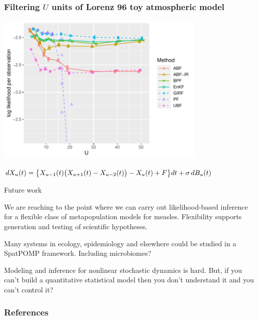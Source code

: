\documentclass{beamer}
\begin{document}
\begin{frame}
\frametitle{Filtering $U$ units of Lorenz 96 toy atmospheric model} 

\vspace{-3mm}

\begin{center}
\includegraphics[width=10cm]{lz_loglik_plot-1.pdf}

\vspace{-1mm}

$dX_{u}(t) = \big \{  X_{u-1}(t) \big(X_{u+1}(t) - X_{u-2}(t)\big) - X_{u}(t) + F \big\} dt + \sigma \, dB_{u}(t)$

\end{center}

\end{frame}

\begin{frame}{Future work}

  \newcommand\futuresep{\vspace{3mm}}
  
  \begin{myitemize}
  \item We are reaching to the point where we can carry out likelihood-based inference for a flexible class of metapopulation models for measles.
Flexibility supports generation and testing of scientific hypotheses.
        
    \futuresep
    

    \futuresep
    
  \item Many systems in ecology, epidemiology and elsewhere could be studied in a SpatPOMP framework. Including microbiomes?

     \futuresep

   \item Modeling and inference for nonlinear stochastic dynamics is hard. But, if you can't build a quantitative statistical model then you don't understand it and you can't control it?
    
\end{myitemize}

\end{frame}

\nocite{bjornstad01,grenfell04,breto19,rebeschini15,ng02,ionides21}

\begin{frame}[allowframebreaks]
\frametitle{References}


\end{frame}

\end{document}
